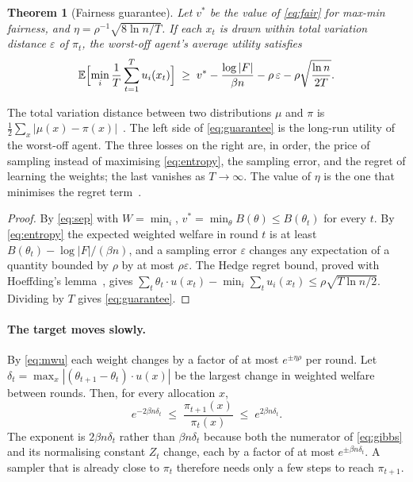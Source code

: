 \documentclass[11pt,a4paper]{article}
\newtheorem{theorem}{Theorem}
\newcommand{\E}{\mathbb{E}}
\begin{document}
\begin{theorem}[Fairness guarantee]\label{thm:dyn}
Let $v^*$ be the value of \eqref{eq:fair} for max-min fairness, and $\eta=\rho^{-1}\sqrt{8\ln n/T}$. If
each $x_t$ is drawn within total variation distance $\varepsilon$ of $\pi_t$, the worst-off agent's
average utility satisfies
\begin{equation}\label{eq:guarantee}
\E\Bigl[\min_i\frac1T\sum_{t=1}^Tu_i(x_t)\Bigr]\;\ge\;v^*-\frac{\log|F|}{\beta n}-\rho\,\varepsilon-\rho\sqrt{\frac{\ln n}{2T}}.
\end{equation}
\end{theorem}

The total variation distance between two distributions $\mu$ and $\pi$ is
$\frac12\sum_x|\mu(x)-\pi(x)|$~\cite{levin2017markov}. The left side of \eqref{eq:guarantee} is the
long-run utility of the worst-off agent. The three losses on the right are, in order, the price of
sampling instead of maximising \eqref{eq:entropy}, the sampling error, and the regret of learning the
weights; the last vanishes as $T\to\infty$. The value of $\eta$ is the one that minimises the regret
term~\cite{cesabianchi2006prediction}.

\begin{proof}
By \eqref{eq:sep} with $W=\min_i$, $v^*=\min_\theta B(\theta)\le B(\theta_t)$ for every $t$. By
\eqref{eq:entropy} the expected weighted welfare in round $t$ is at least $B(\theta_t)-\log|F|/(\beta n)$,
and a sampling error $\varepsilon$ changes any expectation of a quantity bounded by $\rho$ by at most
$\rho\varepsilon$. The Hedge regret bound, proved with Hoeffding's
lemma~\cite{hoeffding1963probability,cesabianchi2006prediction}, gives
$\sum_t\theta_t\cdot u(x_t)-\min_i\sum_tu_i(x_t)\le\rho\sqrt{T\ln n/2}$. Dividing by $T$ gives
\eqref{eq:guarantee}.
\end{proof}

\paragraph{The target moves slowly.} By \eqref{eq:mwu} each weight changes by a factor of at most
$e^{\pm\eta\rho}$ per round. Let $\delta_t=\max_x|(\theta_{t+1}-\theta_t)\cdot u(x)|$ be the largest
change in weighted welfare between rounds. Then, for every allocation $x$,
\begin{equation}\label{eq:drift}
e^{-2\beta n\delta_t}\;\le\;\frac{\pi_{t+1}(x)}{\pi_t(x)}\;\le\;e^{2\beta n\delta_t}.
\end{equation}
The exponent is $2\beta n\delta_t$ rather than $\beta n\delta_t$ because both the numerator of
\eqref{eq:gibbs} and its normalising constant $Z_t$ change, each by a factor of at most
$e^{\pm\beta n\delta_t}$. A sampler that is already close to $\pi_t$ therefore needs only a few steps to
reach $\pi_{t+1}$.
\end{document}

